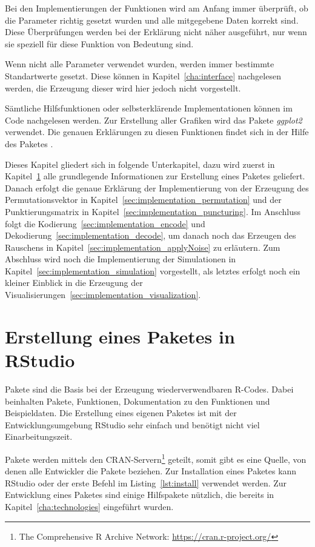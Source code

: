 Bei den Implementierungen der Funktionen wird am Anfang immer überprüft, ob die Parameter richtig gesetzt wurden und alle mitgegebene Daten korrekt sind. Diese Überprüfungen werden bei der Erklärung nicht näher ausgeführt, nur wenn sie speziell für diese Funktion von Bedeutung sind. 

Wenn nicht alle Parameter verwendet wurden, werden immer bestimmte Standartwerte gesetzt. Diese können in Kapitel~\ref{cha:interface} nachgelesen werden, die Erzeugung dieser wird hier jedoch nicht vorgestellt.

Sämtliche Hilfsfunktionen oder selbsterklärende Implementationen können im Code nachgelesen werden. Zur Erstellung aller Grafiken wird das Pakete \emph{ggplot2} verwendet. Die genauen Erklärungen zu diesen Funktionen findet sich in der Hilfe des Paketes \cite{ggplot2}.

Dieses Kapitel gliedert sich in folgende Unterkapitel, dazu wird zuerst in Kapitel~\ref{sec:implementation_package} alle grundlegende Informationen zur Erstellung eines Paketes geliefert. Danach erfolgt die genaue Erklärung der Implementierung von der Erzeugung des Permutationsvektor in Kapitel~\ref{sec:implementation_permutation} und der Punktierungsmatrix in Kapitel~\ref{sec:implementation_puncturing}. Im Anschluss folgt die Kodierung~\ref{sec:implementation_encode} und Dekodierung~\ref{sec:implementation_decode}, um danach noch das Erzeugen des Rauschens in Kapitel~\ref{sec:implementation_applyNoise} zu erläutern. Zum Abschluss wird noch die Implementierung der Simulationen in Kapitel~\ref{sec:implementation_simulation} vorgestellt, als letztes erfolgt noch ein kleiner Einblick in die Erzeugung der Visualisierungen~\ref{sec:implementation_visualization}.

\section{Erstellung eines Paketes in RStudio}
\label{sec:implementation_package}
Pakete sind die Basis bei der Erzeugung wiederverwendbaren R-Codes. Dabei beinhalten Pakete, Funktionen, Dokumentation zu den Funktionen und Beispieldaten. Die Erstellung eines eigenen Paketes ist mit der Entwicklungsumgebung RStudio sehr einfach und benötigt nicht viel Einarbeitungszeit.

Pakete werden mittels den CRAN-Servern\footnote{The Comprehensive R Archive Network: \url{https://cran.r-project.org/}} geteilt, somit gibt es eine Quelle, von denen alle Entwickler die Pakete beziehen. Zur Installation eines Paketes kann RStudio oder der erste Befehl im Listing~\ref{lst:install} verwendet werden. Zur Entwicklung eines Paketes sind einige Hilfspakete nützlich, die bereits in Kapitel~\ref{cha:technologies} eingeführt wurden. 

